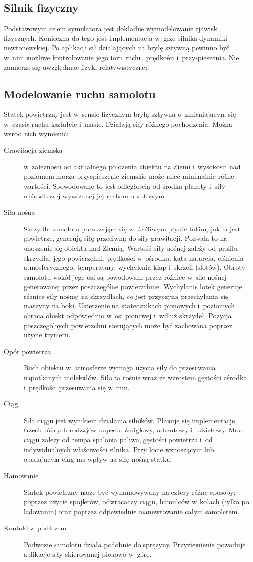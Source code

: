 \documentclass{mwrep}
\begin{document}
\subsection{Silnik fizyczny}

Podstawowym celem symulatora jest dokładne wymodelowanie zjawisk fizycznych. Konieczna do tego jest implementacja w~grze silnika dynamiki newtonowskiej. Po aplikacji sił działających na bryłę sztywną powinno być w~nim możliwe kontrolowanie jego toru ruchu, prędkości i~przyspieszenia. Nie zamierza się uwzględniać fizyki relatywistycznej.

\subsection{Modelowanie ruchu samolotu}

Statek powietrzny jest w~sensie fizycznym bryłą sztywną o~zmieniającym się w~czasie ruchu kształcie i~masie. Działają siły różnego pochodzenia. Można wsród nich wymienić:
\begin{description}
\item[Grawitacja ziemska] w~zależności od aktualnego położenia obiektu na Ziemi i~wysokości nad poziomem morza przyspieszenie ziemskie może mieć minimalnie różne wartości. Spowodowane to jest odległością od środka planety i~siły odśrodkowej wywołanej jej ruchem obrotowym.
\item[Siła nośna] Skrzydła samolotu poruszające się w~ściśliwym płynie takim, jakim jest powietrze, generują siłę przeciwną do siły grawitacji. Pozwala to na unoszenie się obiektu nad Ziemią. Wartość siły nośnej zależy od profilu skrzydła, jego powierzchni, prędkości w~ośrodku, kąta natarcia, ciśnienia atmosferycznego, temperatury, wychylenia klap i~skrzeli (slotów). Obroty samolotu wokół jego osi są powodowane przez różnice w~sile nośnej generowanej przez poszczególne powierzchnie. Wychylanie lotek generuje różnice siły nośnej na skrzydłach, co jest przyczyną przechylania się maszyny na boki. Usterzenie na statecznikach pionowych i~poziomych obraca obiekt odpowiednio w~osi pionowej i~wdłuż skrzydeł. Pozycja poszczególnych powierzchni sterujących może być zachowana poprzez użycie trymeru.
\item[Opór powietrza] Ruch obiektu w~atmosferze wymaga użycia siły do przesuwania napotkanych molekułów. Siła ta rośnie wraz ze wzrostem gęstości ośrodka i~prędkości przesuwania się w~nim.
\item[Ciąg] Siła ciągu jest wynikiem działania silników. Planuje się implementacje trzech różnych rodzajów napędu: śmigłowy, odrzutowy i~rakietowy. Moc ciągu zależy od tempa spalania paliwa, gęstości powietrza i~od indywidualnych właściwości silnika. Przy locie wznoszącym lub opadającym ciąg ma wpływ na siłę nośną statku.
\item[Hamowanie] Statek powietrzny może być wyhamowywany na cztery różne sposoby: poprzez użycie spojlerów, odwracaczy ciągu, hamulców w~kołach (tylko po lądowaniu) oraz poprzez odpowiednie manewrowanie całym samolotem.
\item[Kontakt z~podłożem] Podwozie samolotu działa podobnie do sprężyny. Przyziemienie powoduje aplikacje siły skierowanej pionowo w~górę.
\end{description}
\end{document}
